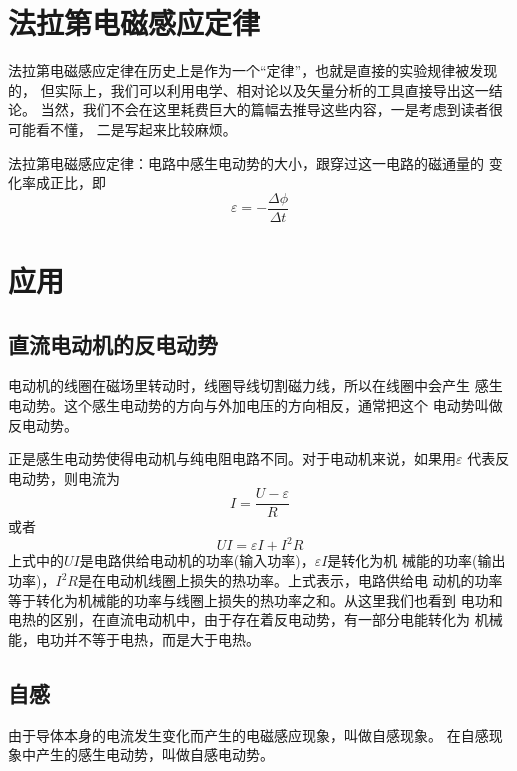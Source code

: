 \section{法拉第电磁感应定律}
法拉第电磁感应定律在历史上是作为一个“定律”，也就是直接的实验规律被发现的，
但实际上，我们可以利用电学、相对论以及矢量分析的工具直接导出这一结论。
当然，我们不会在这里耗费巨大的篇幅去推导这些内容，一是考虑到读者很可能看不懂，
二是写起来比较麻烦。

\begin{theorem}
    法拉第电磁感应定律：电路中感生电动势的大小，跟穿过这一电路的磁通量的
    变化率成正比，即
    \begin{equation}
        \varepsilon=-\frac{\Delta \phi}{\Delta t}
    \end{equation}
\end{theorem}

\section{应用}
\subsection{直流电动机的反电动势}
电动机的线圈在磁场里转动时，线圈导线切割磁力线，所以在线圈中会产生
感生电动势。这个感生电动势的方向与外加电压的方向相反，通常把这个
电动势叫做反电动势。

正是感生电动势使得电动机与纯电阻电路不同。对于电动机来说，如果用$\varepsilon$
代表反电动势，则电流为 
\begin{equation}
    I=\frac{U-\varepsilon}{R}
\end{equation}
或者 
\begin{equation}
    UI=\varepsilon I+I^2R
\end{equation}
上式中的$ U I $是电路供给电动机的功率(输入功率)，$\varepsilon I$是转化为机
械能的功率(输出功率)，$I^2R$是在电动机线圈上损失的热功率。上式表示，电路供给电
动机的功率等于转化为机械能的功率与线圈上损失的热功率之和。从这里我们也看到
电功和电热的区别，在直流电动机中，由于存在着反电动势，有一部分电能转化为
机械能，电功并不等于电热，而是大于电热。
\subsection{自感}
\begin{definition}
    由于导体本身的电流发生变化而产生的电磁感应现象，叫做自感现象。
    在自感现象中产生的感生电动势，叫做自感电动势。
\end{definition}


